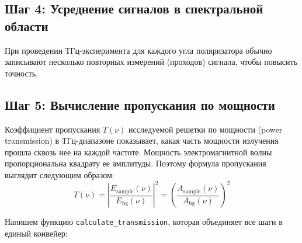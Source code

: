 \subsection{Шаг 4: Усреднение сигналов в спектральной области}

При проведении ТГц-эксперимента для каждого угла поляризатора обычно записывают несколько повторных измерений (проходов) сигнала, чтобы повысить точность.


\subsection{Шаг 5: Вычисление пропускания по мощности}

Коэффициент пропускания $T(\nu)$ исследуемой решетки по мощности (power transmission) в ТГц-диапазоне показывает, какая часть мощности излучения прошла сквозь нее на каждой частоте. Мощность электромагнитной волны пропорциональна квадрату ее амплитуды. Поэтому формула пропускания выглядит следующим образом:
\begin{equation}
T(\nu) = \left| \frac{E_{\text{sample}}(\nu)}{E_{\text{bg}}(\nu)} \right|^2 = \left( \frac{A_{\text{sample}}(\nu)}{A_{\text{bg}}(\nu)} \right)^2
\end{equation}

Напишем функцию \texttt{calculate\_transmission}, которая объединяет все шаги в единый конвейер:

